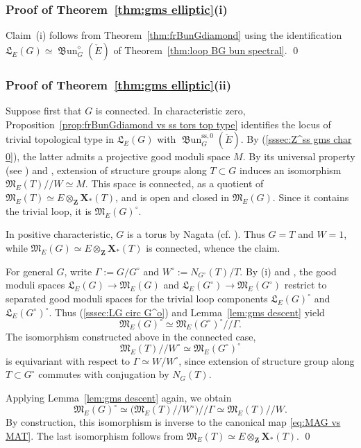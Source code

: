 \documentclass[12pt, oneside]{amsart}
\numberwithin{equation}{section}
\theoremstyle{remark}
\theoremstyle{plain}
\newcommand{\frM}{\mathfrak{M}}
\newcommand{\frL}{\mathfrak{L}}
\newcommand{\modmod}{/\!\!/}
\newcommand{\bZ}{\mathbf{Z}}
\renewcommand{\ss}{\mathrm{ss}}
\newcommand{\frBun}{\operatorname{\mathfrak{B}un}}
\begin{document}
\subsubsection{Proof of Theorem~\ref{thm:gms elliptic}(i)}

Claim~(i) follows from Theorem~\ref{thm:frBunGdiamond} using the
identification $\frL_E(G)\simeq\frBun_G^\diamond(\check{E})$ of
Theorem~\ref{thm:loop BG bun spectral}.
\qed

\subsubsection{Proof of Theorem~\ref{thm:gms elliptic}(ii)}

Suppose first that $G$ is connected.
In characteristic zero, Proposition~\ref{prop:frBunGdiamond vs ss tors top
type} identifies the locus of trivial topological type in $\frL_E(G)$ with $\frBun_G^{\ss,0}(\check{E})$.
By (\ref{sssec:Z^ss gms char 0}), the latter admits a projective good moduli space $M$.
By its universal property (see \cite[Thm.~4.16(vi)]{Alper}) and \cite[Thm.~1.2, Rem.~1.6]{Fratila}, extension of structure groups along $T\subset G$ induces an isomorphism $\frM_E(T)\modmod W \simeq M$.
This space is connected, as a quotient of $\frM_E(T)\simeq E\otimes_{\bZ}\mathbf{X}_*(T)$, and is open and closed in $\frM_E(G)$.
Since it contains the trivial loop, it is $\frM_E(G)^\circ$.

In positive characteristic, $G$ is a torus by Nagata (cf. \cite[Thm.~1.2]{HallRydh}).
Thus $G=T$ and $W=1$, while $\frM_E(G) \simeq E\otimes_{\bZ}\mathbf{X}_*(T)$ is connected, whence the claim.

For general $G$, write $\Gamma := G/G^\circ$ and $W^\circ := N_{G^\circ}(T)/T$.
By (i) and \cite[Lem.~4.14, Thm.~4.16(i--iii)]{Alper}, the good moduli spaces $\frL_E(G) \to \frM_E(G)$ and $\frL_E(G^\circ) \to \frM_E(G^\circ)$ restrict to separated good moduli spaces for the trivial loop components $\frL_E(G)^\circ$ and $\frL_E(G^\circ)^\circ$.
Thus (\ref{sssec:LG circ G^o}) and Lemma~\ref{lem:gms descent} yield
\[
  \frM_E(G)^\circ
  \simeq \frM_E(G^\circ)^\circ\modmod\Gamma.
\]
The isomorphism constructed above in the connected case,
\[
  \frM_E(T)\modmod W^\circ
  \simeq \frM_E(G^\circ)^\circ
\]
is equivariant with respect to $\Gamma\simeq W/W^\circ$, since extension of structure group along $T\subset G^\circ$ commutes with conjugation by $N_G(T)$.

Applying Lemma~\ref{lem:gms descent} again, we obtain
\[
  \frM_E(G)^\circ
  \simeq
  \bigl(\frM_E(T)\modmod W^\circ\bigr)\modmod\Gamma
  \simeq \frM_E(T)\modmod W.
\]
By construction, this isomorphism is inverse to the canonical map
\eqref{eq:MAG vs MAT}.
The last isomorphism follows from $\frM_E(T)\simeq E\otimes_{\bZ}\mathbf{X}_*(T)$.
\qed
\end{document}
